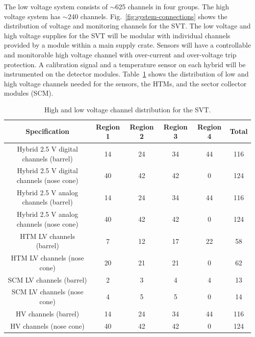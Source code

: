 The low voltage system consists of $\sim$625 channels in four groups.  The 
high voltage system has $\sim$240 channels.  Fig.~\ref{fig:system-connections}
shows the distribution of voltage and monitoring channels for the SVT.  The 
low voltage and high voltage supplies for the SVT will be modular with 
individual channels provided by a module within a main supply crate.  
Sensors will have a controllable and monitorable high voltage channel with 
over-current and over-voltage trip protection.  A calibration signal and a 
temperature sensor on each hybrid will be instrumented on the detector 
modules.  Table~\ref{tab:voltages} shows the distribution of low and high 
voltage channels needed for the sensors, the HTMs, and the sector collector 
modules (SCM). 

\begin{table}[htbp]
\begin{center}
\begin{small}
\begin{tabular}{|c|c|c|c|c|c|} \hline
Specification & Region 1 & Region 2 & Region 3 & Region 4 & Total \\ \hline
Hybrid 2.5 V digital channels (barrel) & 14 & 24 & 34 & 44 & 116 \\ \hline
Hybrid 2.5 V digital channels (nose cone) & 40 & 42 & 42 & 0 & 124 \\ \hline
Hybrid 2.5 V analog channels (barrel) & 14 & 24 & 34 & 44 & 116 \\ \hline
Hybrid 2.5 V analog channels (nose cone) & 40 & 42 & 42 & 0 & 124 \\ \hline
HTM LV channels (barrel) & 7 & 12 & 17 & 22 & 58 \\ \hline
HTM LV channels (nose cone) & 20 & 21 & 21 & 0 & 62 \\ \hline
SCM LV channels (barrel) & 2 & 3 & 4 & 4 & 13 \\ \hline
SCM LV channels (nose cone) & 4 & 5 & 5 & 0 & 14 \\ \hline
HV channels (barrel) & 14 & 24 & 34 & 44 & 116 \\ \hline
HV channels (nose cone) & 40 & 42 & 42 & 0 & 124 \\ \hline \hline
\end{tabular}
\end{small}
\end{center}
\caption{\small{High and low voltage channel distribution for the SVT.}}
\label{tab:voltages}
\end{table}

